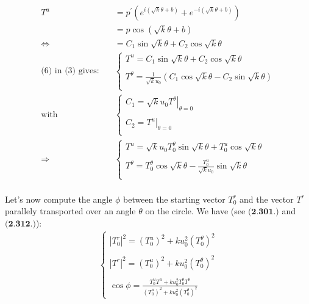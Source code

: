 \begin{align}
T^u  &= p^{'}\left( e^{i(\sqrt{k} \theta + b)}+ e^{-i(\sqrt{k} \theta + b)}\right)\\
 &= p\cos{\left(\sqrt{k} \theta + b \right)}\\
 \Leftrightarrow \quad &=   C_1\sin{\sqrt{k}\theta}+ C_2\cos{\sqrt{k}\theta}\\
 \text{(6) in (3) gives:}\quad & \left \{ \begin{array}{l}
T^u = C_1\sin{\sqrt{k}\theta}+ C_2\cos{\sqrt{k}\theta}\\\\
T^{\theta}  =  \frac{1}{\sqrt{k}u_0}\left(C_1\cos{\sqrt{k}\theta}- C_2\sin{\sqrt{k}\theta}\right)\\
\end{array} \right.\\
\text{with} \quad & \left \{ \begin{array}{l}
 C_1=\sqrt{k}u_0\left.T^{\theta}\right|_{\theta=0} \\\\
 C_2=\left.T^{u}\right|_{\theta=0}\\
\end{array} \right.\\
\Rightarrow \quad & \left \{ \begin{array}{l}
T^u = \sqrt{k} u_0 T^{\theta}_{0}\sin{\sqrt{k}\theta}+ T^{u}_{0}\cos{\sqrt{k}\theta}\\\\
T^{\theta}  =   T^{\theta}_{0}\cos{\sqrt{k}\theta}- \frac{T^{u}_{0}}{\sqrt{k}u_0} \sin{\sqrt{k}\theta}\\
\end{array}\right.
\end{align}\\
Let's now compute the angle $\phi$ between the starting vector $T^r_{0}$ and the vector $T^r$ parallely transported over an angle $\theta$ on the circle. We have (see $\textbf{(2.301.)}$ and $\textbf{(2.312.)}$):
\begin{align*}
\left \{ \begin{array}{l}
 \left| T^r_0 \right|^2 =  \left(T^u_0\right)^2 + k u^2_0\left(T^{\theta}_0\right)^2\\\\
 \left| T^r \right|^2 =  \left(T^u_0\right)^2 + k u^2_0\left(T^{\theta}_0\right)^2\\\\
 \cos{\phi} =  \frac{T^u_0 T^u+k u^2_0T^{\theta}_0 T^{\theta} }{\left(T^u_0\right)^2 + k u^2_0\left(T^{\theta}_0\right)^2}
\end{array} \right.
\end{align*}
